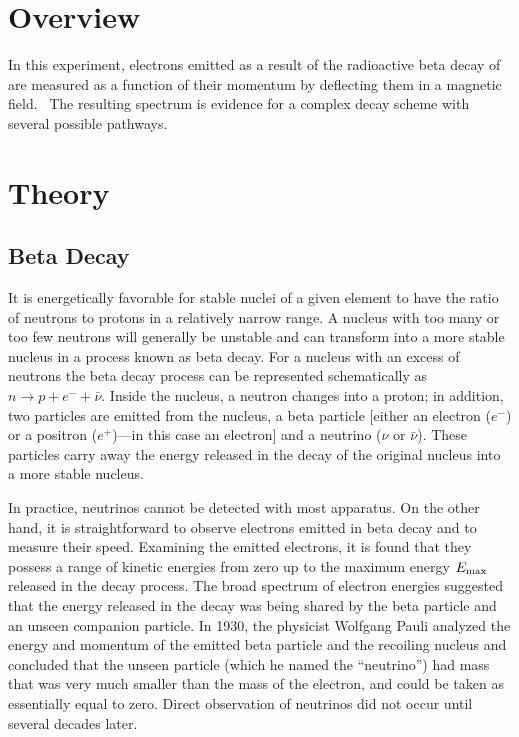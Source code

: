 \section{Overview}
In this experiment, electrons emitted as a result of the radioactive
beta decay of \cs are measured as a function of their momentum by
deflecting them in a magnetic field. \ The resulting spectrum is
evidence for a complex decay scheme with several possible pathways.

\section{Theory}
\subsection{Beta Decay}

It is energetically favorable for stable nuclei of a given element to
have the ratio of neutrons to protons in a relatively narrow range.  A
nucleus with too many or too few neutrons will generally be unstable
and can transform into a more stable nucleus in a process known as beta
decay.  For a nucleus with an excess of neutrons the beta decay
process can be represented schematically as $n \to p + e^- + \bar{\nu}$.
Inside the nucleus, a neutron changes into a proton; in addition,
two particles are emitted from the nucleus, a beta particle [either an
electron ($e^-$) or a positron
($e^+$)---in this case an electron]
and a neutrino ($\nu$ or $\bar{\nu}$).  These particles carry
away the energy released in the decay of the original nucleus into a
more stable nucleus.

In practice, neutrinos cannot be detected with most apparatus.
On the other hand, it is straightforward to observe electrons emitted
in beta decay and to measure their speed. Examining the emitted
electrons, it is found that they possess a range of kinetic energies
from zero up to the maximum energy
$E_{\rm max}$ released in the decay process.
The broad spectrum of electron energies suggested that the energy
released in the decay was being shared by the beta particle and an
unseen companion particle.  In 1930, the physicist Wolfgang Pauli
analyzed the energy and momentum of the emitted beta particle and the
recoiling nucleus and concluded that the unseen particle (which he
named the ``neutrino'') had mass that was
very much smaller than the mass of the electron, and could be taken as
essentially equal to zero.  Direct observation of neutrinos did not
occur until several decades later.


